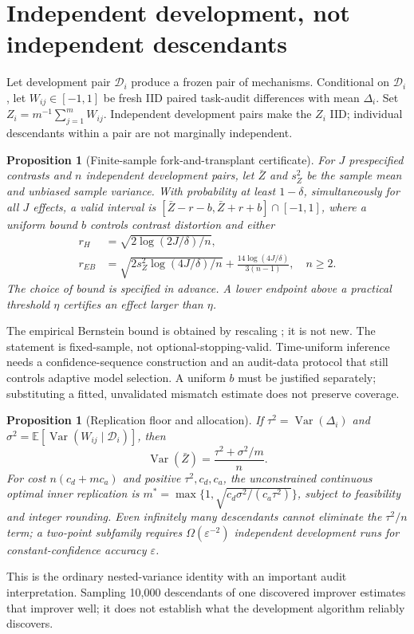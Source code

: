 \documentclass{article}
\newtheorem{proposition}[theorem]{Proposition}
\theoremstyle{definition}
\newcommand{\E}{\mathbb E}
\newcommand{\Var}{\operatorname{Var}}
\newcommand{\eps}{\varepsilon}
\begin{document}
\section{Independent development, not independent descendants}\label{sec:stats}
Let development pair $\mathcal D_i$ produce a frozen pair of mechanisms. Conditional on $\mathcal D_i$, let $W_{ij}\in[-1,1]$ be fresh IID paired task-audit differences with mean $\Delta_i$. Set $Z_i=m^{-1}\sum_{j=1}^mW_{ij}$. Independent development pairs make the $Z_i$ IID; individual descendants within a pair are not marginally independent.

\begin{proposition}[Finite-sample fork-and-transplant certificate]\label{prop:certificate}
For $J$ prespecified contrasts and $n$ independent development pairs, let $\bar Z$ and $s_Z^2$ be the sample mean and unbiased sample variance. With probability at least $1-\delta$, simultaneously for all $J$ effects, a valid interval is $[\bar Z-r-b,\bar Z+r+b]\cap[-1,1]$, where a uniform bound $b$ controls contrast distortion and either
\begin{align}
 r_H&=\sqrt{2\log(2J/\delta)/n},\label{eq:hoeffding}\\
 r_{EB}&=\sqrt{2s_Z^2\log(4J/\delta)/n}
          +\frac{14\log(4J/\delta)}{3(n-1)},\quad n\geq2.\label{eq:eb}
\end{align}
The choice of bound is specified in advance. A lower endpoint above a practical threshold $\eta$ certifies an effect larger than $\eta$.
\end{proposition}
The empirical Bernstein bound is obtained by rescaling \citet[Theorem~4]{maurer}; it is not new. The statement is fixed-sample, not optional-stopping-valid. Time-uniform inference needs a confidence-sequence construction \citep{howard} and an audit-data protocol that still controls adaptive model selection. A uniform $b$ must be justified separately; substituting a fitted, unvalidated mismatch estimate does not preserve coverage.

\begin{proposition}[Replication floor and allocation]\label{prop:variance}
If $\tau^2=\Var(\Delta_i)$ and $\sigma^2=\E[\Var(W_{ij}\mid\mathcal D_i)]$, then
\begin{equation}
 \Var(\bar Z)=\frac{\tau^2+\sigma^2/m}{n}.\label{eq:variance}
\end{equation}
For cost $n(c_d+mc_a)$ and positive $\tau^2,c_d,c_a$, the unconstrained continuous optimal inner replication is $m^*=\max\{1,\sqrt{c_d\sigma^2/(c_a\tau^2)}\}$, subject to feasibility and integer rounding. Even infinitely many descendants cannot eliminate the $\tau^2/n$ term; a two-point subfamily requires $\Omega(\eps^{-2})$ independent development runs for constant-confidence accuracy $\eps$.
\end{proposition}
This is the ordinary nested-variance identity with an important audit interpretation. Sampling 10,000 descendants of one discovered improver estimates that improver well; it does not establish what the development algorithm reliably discovers.
\end{document}
